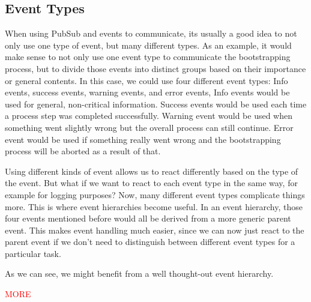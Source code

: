 \subsection{Event Types}

When using PubSub and events to communicate, its usually a good idea to not only use one type of event, but many different types.
As an example, it would make sense to not only use one event type to communicate the bootstrapping process, but to divide those events into distinct groups based on their importance or general contents.
In this case, we could use four different event types: Info events, success events, warning events, and error events,
Info events would be used for general, non-critical information.
Success events would be used each time a process step was completed successfully.
Warning event would be used when something went slightly wrong but the overall process can still continue.
Error event would be used if something really went wrong and the bootstrapping process will be aborted as a result of that.

Using different kinds of event allows us to react differently based on the type of the event.
But what if we want to react to each event type in the same way, for example for logging purposes?
Now, many different event types complicate things more.
This is where event hierarchies become useful.
In an event hierarchy, those four events mentioned before would all be derived from a more generic parent event.
This makes event handling much easier, since we can now just react to the parent event if we don't need to distinguish between different event types for a particular task.

As we can see, we might benefit from a well thought-out event hierarchy.

\textcolor{red}{MORE}
